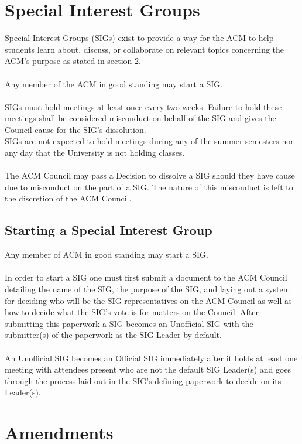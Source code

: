\documentclass[12pt,titlepage]{article}
\begin{document}
\section{Special Interest Groups}

Special Interest Groups (SIGs) exist to provide a way for the ACM to help students learn about, discuss, or collaborate on relevant topics concerning the ACM's purpose as stated in section 2.\\ 
\\
Any member of the ACM in good standing may start a SIG.\\
\\
SIGs must hold meetings at least once every two weeks. Failure to hold these meetings shall be considered misconduct on behalf of the SIG and gives the Council cause for the SIG's dissolution.
\\
SIGs are not expected to hold meetings during any of the summer semesters nor any day that the University is not holding classes.\\
\\
The ACM Council may pass a Decision to dissolve a SIG should they have cause due to misconduct on the part of a SIG. The nature of this misconduct is left to the discretion of the ACM Council.

\subsection{Starting a Special Interest Group}

Any member of ACM in good standing may start a SIG.\\
\\
In order to start a SIG one must first submit a document to the ACM Council detailing the name of the SIG, the purpose of the SIG, and laying out a system for deciding who will be the SIG representatives on the ACM Council as well as how to decide what the SIG's vote is for matters on the Council. After submitting this paperwork a SIG becomes an Unofficial SIG with the submitter(s) of the paperwork as the SIG Leader by default.\\
\\
An Unofficial SIG becomes an Official SIG immediately after it holds at least one meeting with attendees present who are not the default SIG Leader(s) and goes through the process laid out in the SIG's defining paperwork to decide on its Leader(s).

\section{Amendments}
\end{document}
